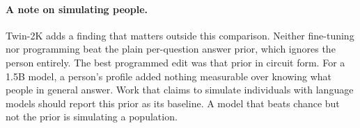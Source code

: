 \paragraph{A note on simulating people.} Twin-2K adds a finding that matters outside this comparison. Neither fine-tuning nor programming beat the plain per-question answer prior, which ignores the person entirely. The best programmed edit was that prior in circuit form. For a 1.5B model, a person's profile added nothing measurable over knowing what people in general answer. Work that claims to simulate individuals with language models should report this prior as its baseline. A model that beats chance but not the prior is simulating a population.
